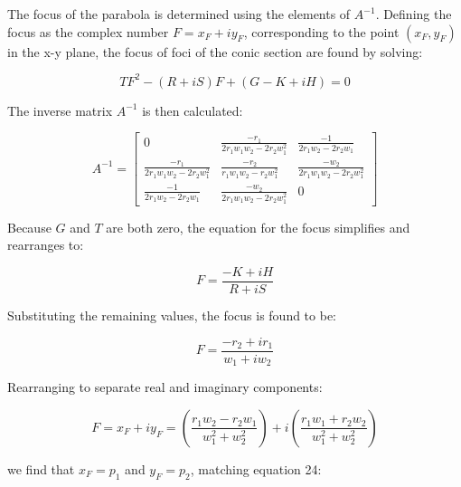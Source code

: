 \documentclass[11pt]{article}
\begin{document}
        The focus of the parabola is determined using the elements of $A^{-1}$. Defining the focus as the complex number $F = x_F + iy_F$, corresponding to the point $(x_F,y_F)$ in the x-y plane, the focus of foci of the conic section are found by solving: 
    
        \begin{equation}
            TF^2 - (R + iS)F + (G - K + iH) = 0
            \label{eq:Eq55}
        \end{equation}
    
        The inverse matrix $A^{-1}$ is then calculated:
    
        \begin{equation}
            A^{-1} = 
            \begin{bmatrix} 0 & \frac{-r_1}{2r_1w_1w_2 - 2r_2w_1^2} & \frac{-1}{2r_1w_2-2r_2w_1} \\ 
                            \frac{-r_1}{2r_1w_1w_2 - 2r_2w_1^2} & \frac{-r_2}{r_1w_1w_2 - r_2w_1^2}   & \frac{-w_2}{2r_1w_1w_2 - 2r_2w_1^2} \\ 
                            \frac{-1}{2r_1w_2-2r_2w_1} & \frac{-w_2}{2r_1w_1w_2 - 2r_2w_1^2} & 0
            \end{bmatrix}
            \label{eq:Eq56}
        \end{equation}
    
        Because $G$ and $T$ are both zero, the equation for the focus simplifies and rearranges to: 
    
        \begin{equation}
            F = \frac{-K + iH}{R + iS}
            \label{eq:Eq57}
        \end{equation}
    
        Substituting the remaining values, the focus is found to be:
        
        \begin{equation}
            F = \frac{-r_2 + ir_1}{w_1 + iw_2}
            \label{eq:Eq58}
        \end{equation}
    
        Rearranging to separate real and imaginary components:

        \begin{equation}
            F = x_F + iy_F = \left(\frac{r_1w_2 - r_2w_1}{w_1^2 + w_2^2}\right) + i\left(\frac{r_1w_1 + r_2w_2}{w_1^2 + w_2^2}\right)
            \label{eq:Eq59}
        \end{equation}

    
        we find that $x_F = p_1$ and $y_F = p_2$, matching equation 24:
\end{document}
